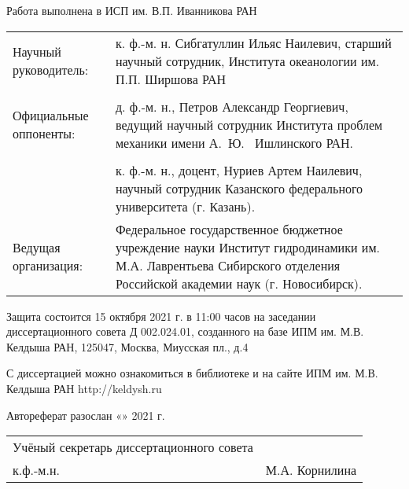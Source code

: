 \documentclass[utf8x]{G7-32} %
\begin{document}
\newpage
\pagestyle{empty}
\begin{spacing}{1.2}
\pagestyle{empty}
\begin{flushleft}
  Работа выполнена в ИСП им. В.П. Иванникова РАН
\end{flushleft}
\pagestyle{empty}
\begin{flushleft}
\begin{tabular}{p{5.8cm} p{10.5cm}}
    Научный руководитель: & к. ф.-м. н. Сибгатуллин Ильяс Наилевич, старший научный сотрудник, Института океанологии им. П.П. Ширшова РАН  \\

    \\

    Официальные оппоненты: &  д. ф.-м. н., Петров Александр Георгиевич, ведущий научный сотрудник Института проблем механики имени А.~Ю.~ Ишлинского РАН. \\
  

    \\

    & к. ф.-м. н., доцент, Нуриев Артем Наилевич, научный сотрудник Казанского федерального университета (г. Казань).
    
    \\

    Ведущая организация: & Федеральное государственное бюджетное учреждение науки 
    Институт гидродинамики им. М.А. Лаврентьева Сибирского отделения Российской академии наук (г. Новосибирск). 
    
\end{tabular}
\end{flushleft}

\begin{flushleft}
    Защита состоится 15 октября 2021 г. в 11:00 часов на заседании диссертационного совета Д 002.024.01, созданного на базе ИПМ им. М.В. Келдыша РАН, 125047, Москва, Миусская пл., д.4

    \setlength{\parskip}{1em}

    С диссертацией можно ознакомиться в библиотеке и на сайте ИПМ им. М.В. Келдыша РАН http://keldysh.ru 

    \setlength{\parskip}{1em}
    \vspace{1cm}
    Автореферат разослан «\underline{\hspace{1cm}}» \underline{\hspace{4cm}} 2021 г.    
\end{flushleft}
\vspace{2cm}
\setlength{\parskip}{1em}
\begin{flushleft}
    \begin{tabular}{p{10cm} p{5cm}}

        Учёный секретарь диссертационного совета \\ к.ф.-м.н.  
    & М.А. Корнилина  
        
    \end{tabular}
\end{flushleft}
\end{spacing}
\newpage
\end{document}
